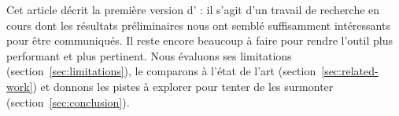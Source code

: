 Cet article décrit la première version d'{\Asak} : il s'agit d'un
travail de recherche en cours dont les résultats préliminaires nous
ont semblé suffisamment intéressants pour être communiqués. Il reste
encore beaucoup à faire pour rendre l'outil plus performant et plus
pertinent. Nous évaluons ses limitations
(section~\ref{sec:limitations}), le comparons à l'état de l'art
(section~\ref{sec:related-work}) et donnons les pistes à explorer pour
tenter de les surmonter (section~\ref{sec:conclusion}).
